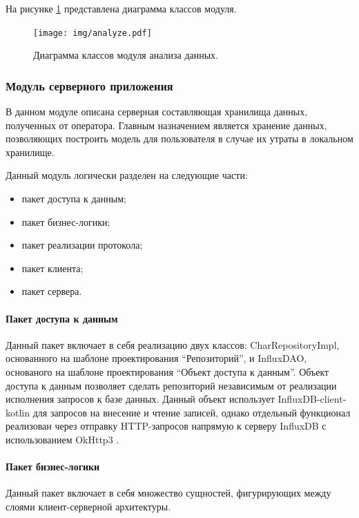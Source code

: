 На рисунке \ref{fig:analyzerUml} представлена диаграмма классов модуля.

\begin{figure}[H]
	\centering
	\texttt{[image: img/analyze.pdf]}
	\caption{Диаграмма классов модуля анализа данных.}
	\label{fig:analyzerUml}
\end{figure}

\subsubsection{Модуль серверного приложения}
В данном модуле описана серверная составляющая хранилища данных, полученных от оператора. Главным назначением является хранение данных, позволяющих построить модель для пользователя в случае их утраты в локальном хранилище.

Данный модуль логически разделен на следующие части:

\begin{itemize}[leftmargin=1.6\parindent]
	\item пакет доступа к данным;
	\item пакет бизнес-логики;
	\item пакет реализации протокола;
	\item пакет клиента;
	\item пакет сервера.
\end{itemize}

\paragraph{Пакет доступа к данным \newline}
Данный пакет включает в себя реализацию двух классов: CharRepositoryImpl, основанного на шаблоне проектирования ``Репозиторий'', и InfluxDAO, основаного на шаблоне проектирования ``Объект доступа к данным''. Объект доступа к данным позволяет сделать репозиторий независимым от реализации исполнения запросов к базе данных. Данный объект использует InfluxDB-client-kotlin \cite{influxClientKotlin} для запросов на внесение и чтение записей, однако отдельный функционал реализован через отправку HTTP-запросов напрямую к серверу InfluxDB с использованием OkHttp3 \cite{OkHttp}.

\paragraph{Пакет бизнес-логики \newline}
Данный пакет включает в себя множество сущностей, фигурирующих между слоями клиент-серверной архитектуры.

